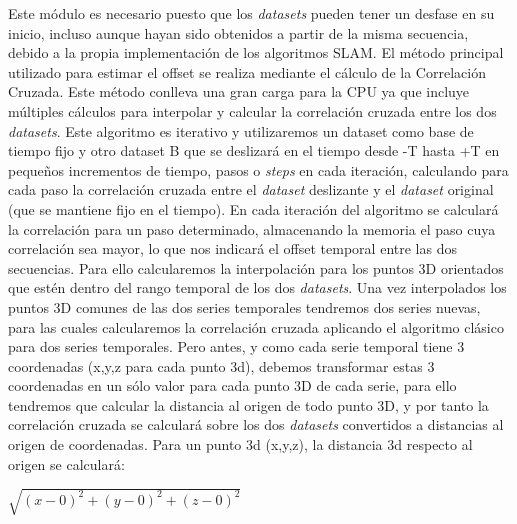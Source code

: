 Este módulo es necesario puesto que los \textit{datasets} pueden tener un desfase en su inicio, incluso aunque hayan sido obtenidos a partir de la misma secuencia, debido a la propia implementación de los algoritmos SLAM. El método principal utilizado para estimar el offset se realiza mediante el cálculo de la Correlación Cruzada. 
Este método conlleva una gran carga para la CPU ya que incluye múltiples cálculos para interpolar y calcular la correlación cruzada entre los dos \textit{datasets}. Este algoritmo es iterativo y utilizaremos un dataset como base de tiempo fijo y otro dataset B que se deslizará en el tiempo desde -T hasta +T en pequeños incrementos de tiempo, pasos o \textit{steps} en cada iteración, calculando para cada paso la correlación cruzada entre el \textit{dataset} deslizante y el \textit{dataset} original (que se mantiene fijo en el tiempo). 
En cada iteración del algoritmo se calculará la correlación para un paso determinado, almacenando la memoria el paso cuya correlación sea mayor, lo que nos indicará el offset temporal entre las dos secuencias. Para ello calcularemos la interpolación para los puntos 3D orientados que estén dentro del rango temporal de los dos \textit{datasets}. Una vez interpolados los puntos 3D comunes de las dos series temporales tendremos dos series nuevas, para las cuales calcularemos la correlación cruzada aplicando el algoritmo clásico para dos series temporales. Pero antes, y como cada serie temporal tiene 3 coordenadas (x,y,z para cada punto 3d), debemos transformar estas 3 coordenadas en un sólo valor para cada punto 3D de cada serie, para ello tendremos que calcular la distancia al origen de todo punto 3D, y por tanto la correlación cruzada se calculará sobre los dos \textit{datasets} convertidos a distancias al origen de coordenadas.
Para un punto 3d (x,y,z), la distancia 3d respecto al origen se calculará:
\begin{center}
	\begin{math}
	\sqrt{(x-0)^2 +(y-0)^2+(z-0)^2}
	\end{math}
\end{center}

